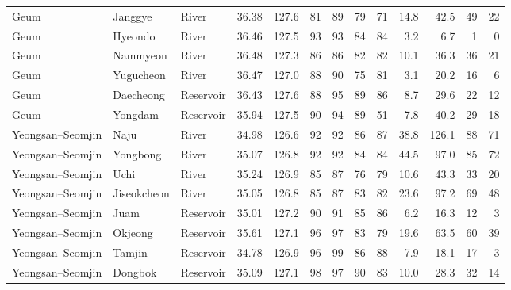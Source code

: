 \begin{table}[tbp]
\begin{adjustbox}{max width=\textwidth}
\begin{tabular}{lllrrrrrrrrrr}
Geum & Janggye & River & 36.38 & 127.6 & 81 & 89 & 79 & 71 & 14.8 & 42.5 & 49 & 22 \\
Geum & Hyeondo & River & 36.46 & 127.5 & 93 & 93 & 84 & 84 & 3.2 & 6.7 & 1 & 0 \\
Geum & Nammyeon & River & 36.48 & 127.3 & 86 & 86 & 82 & 82 & 10.1 & 36.3 & 36 & 21 \\
Geum & Yugucheon & River & 36.47 & 127.0 & 88 & 90 & 75 & 81 & 3.1 & 20.2 & 16 & 6 \\
Geum & Daecheong & Reservoir & 36.43 & 127.6 & 88 & 95 & 89 & 86 & 8.7 & 29.6 & 22 & 12 \\
Geum & Yongdam & Reservoir & 35.94 & 127.5 & 90 & 94 & 89 & 51 & 7.8 & 40.2 & 29 & 18 \\
\midrule
Yeongsan--Seomjin & Naju & River & 34.98 & 126.6 & 92 & 92 & 86 & 87 & 38.8 & 126.1 & 88 & 71 \\
Yeongsan--Seomjin & Yongbong & River & 35.07 & 126.8 & 92 & 92 & 84 & 84 & 44.5 & 97.0 & 85 & 72 \\
Yeongsan--Seomjin & Uchi & River & 35.24 & 126.9 & 85 & 87 & 76 & 79 & 10.6 & 43.3 & 33 & 20 \\
Yeongsan--Seomjin & Jiseokcheon & River & 35.05 & 126.8 & 85 & 87 & 83 & 82 & 23.6 & 97.2 & 69 & 48 \\
Yeongsan--Seomjin & Juam & Reservoir & 35.01 & 127.2 & 90 & 91 & 85 & 86 & 6.2 & 16.3 & 12 & 3 \\
Yeongsan--Seomjin & Okjeong & Reservoir & 35.61 & 127.1 & 96 & 97 & 83 & 79 & 19.6 & 63.5 & 60 & 39 \\
Yeongsan--Seomjin & Tamjin & Reservoir & 34.78 & 126.9 & 96 & 99 & 86 & 88 & 7.9 & 18.1 & 17 & 3 \\
Yeongsan--Seomjin & Dongbok & Reservoir & 35.09 & 127.1 & 98 & 97 & 90 & 83 & 10.0 & 28.3 & 32 & 14 \\
\bottomrule
\end{tabular}
\end{adjustbox}
\end{table}
